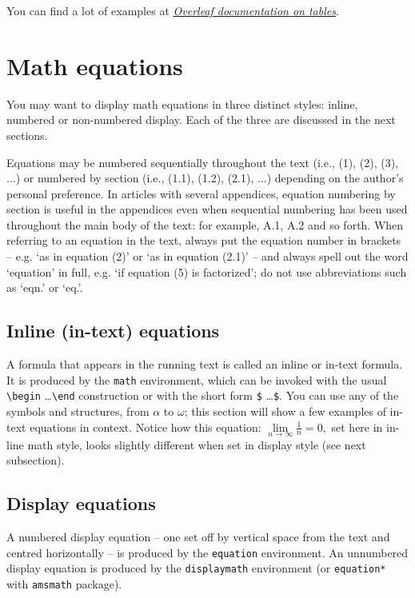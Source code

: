 \documentclass[a4paper]{jpconf}
\begin{document}
You can find a lot of examples at \href{https://www.overleaf.com/learn/latex/Tables}{\textit{Overleaf documentation on tables}}. 

\section{Math equations}

You may want to display math equations in three distinct styles: inline, numbered or non-numbered display. Each of the three are discussed in the next sections.

Equations may be numbered sequentially throughout the text (i.e., (1), (2), (3), ...) or numbered by section (i.e., (1.1), (1.2), (2.1), ...) depending on the author’s personal preference. In articles with several appendices, equation numbering by section is useful in the appendices even when sequential numbering has been used throughout the main body of the text: for example,  A.1, A.2 and so forth. When referring to an equation in the text, always put the equation number in brackets -- e.g. ‘as in equation (2)’ or ‘as in equation (2.1)’ -- and always spell out the word ‘equation’  in full, e.g. ‘if equation (5) is factorized’; do not use abbreviations such as ‘eqn.’ or ‘eq.’.

\subsection{Inline (in-text) equations}

A formula that appears in the running text is called an inline or in-text formula. It is produced by the \verb|math| environment, which can be invoked with the usual \verb|\begin| \ldots \verb|\end| construction or with the short form \verb|$| \ldots \verb|$|. You can use any of the symbols and structures, from $\alpha$ to $\omega$; this section will show a few examples of in-text equations in context. Notice how this equation:
\begin{math}
\lim\limits_{n\rightarrow \infty} \frac{1}{n} = 0,
\end{math}
set here in in-line math style, looks slightly different when set in display style (see next subsection).

\subsection{Display equations}

A numbered display equation -- one set off by vertical space from the text and centred horizontally -- is produced by the \verb|equation| environment. An unnumbered display equation is produced by the \verb|displaymath| environment (or \verb|equation*| with \verb|amsmath| package).
\end{document}
